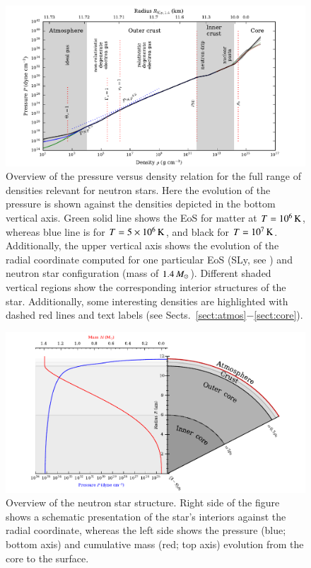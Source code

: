 \begin{figure}
\centering
\includegraphics[width=17cm]{notes/eos/eos.pdf}
\caption{\label{fig:eos}
Overview of the pressure versus density relation for the full range of densities relevant for neutron stars.
Here the evolution of the pressure is shown against the densities depicted in the bottom vertical axis.
Green solid line shows the EoS for matter at $T=10^6\, \mathrm{K}$, whereas blue line is for $T=5 \times 10^{6}\, \mathrm{K}$, and black for $T=10^7 \, \mathrm{K}$.
Additionally, the upper vertical axis shows the evolution of the radial coordinate computed for one particular EoS (SLy, see ) and neutron star configuration (mass of $1.4\, M_{\odot}$).
Different shaded vertical regions show the corresponding interior structures of the star.
Additionally, some interesting densities are highlighted with dashed red lines and text labels (see Sects.~\ref{sect:atmos}$-$\ref{sect:core}).
}
\end{figure}


\begin{figure}
\centering
\includegraphics[width=17cm]{figs/slice/slice.pdf}
\caption{\label{fig:slice}
Overview of the neutron star structure.
Right side of the figure shows a schematic presentation of the star's interiors against the radial coordinate, whereas the left side shows the pressure (blue; bottom axis) and cumulative mass (red; top axis) evolution from the core to the surface.
}
\end{figure}


